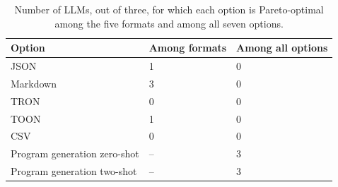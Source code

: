 \begin{table}[t]
\centering
\caption{Number of LLMs, out of three, for which each option is Pareto-optimal among the five formats and among all seven options.}
\label{tab:rq5_pareto}
\begin{tabularx}{\columnwidth}{lXX}
\toprule
Option & Among formats & Among all options \\
\midrule
JSON & 1 & 0 \\
Markdown & 3 & 0 \\
TRON & 0 & 0 \\
TOON & 1 & 0 \\
CSV & 0 & 0 \\
\midrule
Program generation zero-shot & -- & 3 \\
Program generation two-shot & -- & 3 \\
\bottomrule
\end{tabularx}
\end{table}
